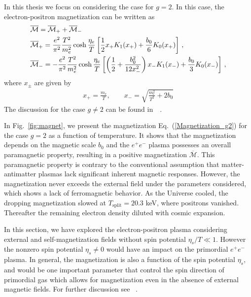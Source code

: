 
In this thesis we focus on considering the case for $g=2$. In this case, the electron-positron magnetization can be written as 
\begin{align}\label{Magnetization_g2}
&{\overline{\mathcal M}}={\overline{\mathcal M}_+}+{\overline{\mathcal M}_-}\\
&{\overline{\cal M}}_{+}=\frac{e^{2}}{\pi^{2}}\frac{T^{2}}{m_{e}^{2}}\cosh{\frac{\eta_e}{T}}\left[\frac{1}{2}x_{+}K_{1}(x_{+})+\frac{b_{0}}{6}K_{0}(x_{+})\right]\,,\\
&{\overline{\cal M}}_{-}=-\frac{e^{2}}{\pi^{2}}\frac{T^{2}}{m_{e}^{2}}\cosh{\frac{\eta_e}{T}}\left[\left(\frac{1}{2}+\frac{b_{0}^{2}}{12x_{-}^{2}}\right)x_{-}K_{1}(x_{-})+\frac{b_{0}}{3}K_{0}(x_{-})\right]\,,
\end{align}
where $x_\pm$ are given by
\begin{align}
x_{+}=\frac{m_{e}}{T},\qquad   x_{-}=\sqrt{\frac{m_{e}^{2}}{T^{2}}+2b_{0}}
\end{align}
The discussion for the case $g\neq2$ can be found in~~\cite{Andrew:2023abc}.

In Fig.~\ref{fig:magnet}, we present the magnetization Eq.~(\ref{Magnetization_g2}) for the case $g=2$ as a function of temperature. It shows that the magnetization depends on the magnetic scale $b_0$ and the $e^{+}e^{-}$ plasma possesses an overall paramagnetic property, resulting in a positive magnetization $\overline{\mathcal{M}}$. This paramagnetic property is contrary to the conventional assumption that matter-antimatter plasmas lack significant inherent magnetic responses. However, the magnetization never exceeds the external field under the parameters considered, which shows a lack of ferromagnetic behavior. As the Universe cooled, the dropping magnetization slowed at $T_{\mathrm{split}}=20.3$ keV, where positrons vanished. Thereafter the remaining electron density diluted with cosmic expansion.

In this section, we have explored the electron-positron plasma considering  external and self-magnetization fields  without spin potential $\eta_s/T\ll1$. However the nonzero spin potential $\eta_s\neq0$  would have an impact on the primordial $e^{+}e^{-}$ plasma. In general, the  magnetization is also a function of the spin potential $\eta_s$, and would be one important parameter that control the spin direction of primordial gas which allows for magnetization even in the absence of external magnetic fields. For further discussion see ~\cite{Andrew:2023abc}.


